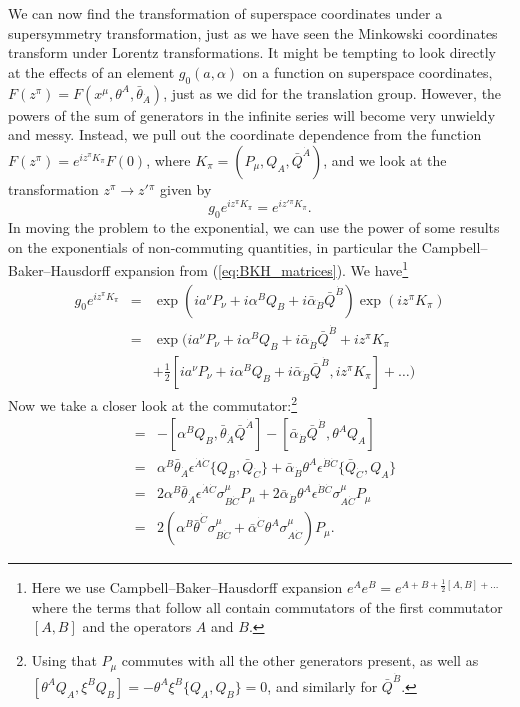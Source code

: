 \documentclass[notes.tex]{subfiles}
\begin{document}
We can now find the transformation of superspace coordinates under a supersymmetry transformation, just as we have seen the Minkowski coordinates transform under Lorentz transformations. It might be tempting to look directly at the effects of an element $g_0(a, \alpha)$ on a function on superspace coordinates, $F(z^\pi) = F(x^\mu, \theta^A, \bar{\theta}_{\dot{A}})$, just as we did for the translation group. However, the powers of the sum of generators in the infinite series will become very unwieldy and messy. Instead, we pull out the coordinate dependence from the function $F(z^\pi) = e^{iz^\pi K_\pi}F(0)$, where $K_\pi=(P_\mu,Q_A,\bar{Q}^{\dot{A}})$,  and we look at the transformation $z^\pi \to z'{}^\pi$ given by
\[g_0e^{iz^\pi K_\pi} = e^{iz'{}^\pi K_\pi}.\]
In moving the problem to the exponential, we can use the power of some results on the exponentials of non-commuting quantities, in particular the Campbell--Baker--Hausdorff expansion from (\ref{eq:BKH_matrices}).
We have\footnote{Here we use Campbell--Baker--Hausdorff expansion $e^{A}e^{B} = e^{A + B + \frac{1}{2}[A, B] + ...}$ where the terms that follow all contain commutators of the first commutator  $[A, B] $ and the operators $A$ and $B$.}
\begin{eqnarray*}
g_0 e^{iz^\pi K_\pi} &=& \exp(ia^\nu P_\nu + i\alpha^BQ_B + i\bar{\alpha}_{\dot{B}}\bar{Q}^{\dot{B}})\exp( iz^\pi K_\pi)\\
&=& \exp(ia^\nu P_\nu + i\alpha^BQ_B + i\bar{\alpha}_{\dot{B}}\bar{Q}^{\dot{B}} + iz^\pi K_\pi\\
&& + \frac{1}{2}[ia^\nu P_\nu + i\alpha^BQ_B + i\bar{\alpha}_{\dot{B}}\bar{Q}^{\dot{B}}, iz^\pi K_\pi] + \ldots)
\end{eqnarray*}
Now we take a closer look at the commutator:\footnote{Using that $P_\mu$ commutes with all the other generators present, as well as $[\theta^A Q_A, \xi^B Q_B] = -\theta^A\xi^B\{Q_A, Q_B\} = 0$, and similarly for $\bar{Q}^{\dot{B}}$.}
\begin{eqnarray*}
[~,~]&=&-[\alpha^BQ_B,\bar{\theta}_{\dot{A}}\bar{Q}^{\dot{A}}] - [\bar{\alpha}_{\dot{B}}\bar{Q}^{\dot{B}}, \theta^AQ_A]\\
&=&\alpha^B\bar{\theta}_{\dot{A}}\epsilon^{\dot{A}\dot{C}}\{Q_B,\bar{Q}_{\dot{C}}\} + \bar{\alpha}_{\dot{B}}\theta^A\epsilon^{\dot{B}\dot{C}}\{\bar{Q}_{\dot{C}}, Q_A\}\\
&=&2\alpha^B\bar{\theta}_{\dot{A}}\epsilon^{\dot{A}\dot{C}}\sigma^\mu_{B\dot{C}}P_\mu + 2\bar{\alpha}_{\dot{B}}\theta^A\epsilon^{\dot{B}\dot{C}}\sigma^\mu_{A\dot{C}}P_\mu\\
&=&2(\alpha^B\bar{\theta}^{\dot{C}}\sigma^\mu_{B\dot{C}} + \bar{\alpha}^{\dot{C}}\theta^A\sigma^\mu_{A\dot{C}})P_\mu .
\end{eqnarray*}
\end{document}
